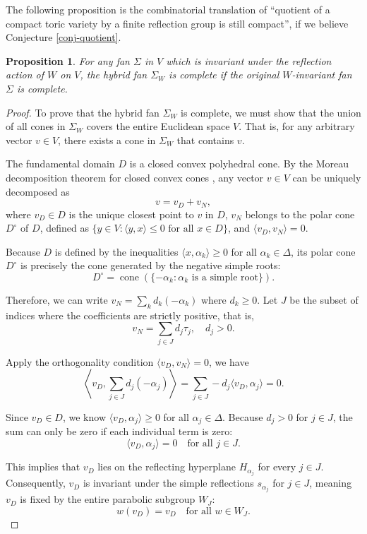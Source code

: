 \documentclass{amsart}
\newtheorem{proposition}[theorem]{Proposition}
\theoremstyle{definition}
\theoremstyle{remark}
\numberwithin{equation}{section}
\begin{document}
The following proposition is the combinatorial translation of ``quotient of a compact toric variety by a finite reflection group is still compact'', if we believe Conjecture \ref{conj-quotient}.
\begin{proposition} \label{prop-completeness}
    For any fan $\Sigma$ in $V$ which is invariant under the reflection action of $W$ on $V$, the hybrid fan $\Sigma_W$ is complete if the original $W$-invariant fan $\Sigma$ is complete.
\end{proposition}
\begin{proof}
To prove that the hybrid fan $\Sigma_W$ is complete, we must show that the union of all cones in $\Sigma_W$ covers the entire Euclidean space $V$. That is, for any arbitrary vector $v \in V$, there exists a cone in $\Sigma_W$ that contains $v$.

The fundamental domain $D$ is a closed convex polyhedral cone. By the Moreau decomposition theorem for closed convex cones \cite[Theorem 3.2.5]{hiriart2013convex}, any vector $v \in V$ can be uniquely decomposed as
$$v = v_D + v_N,$$
where $v_D \in D$ is the unique closest point to $v$ in $D$, $v_N$ belongs to the polar cone $D^\circ$ of $D$, defined as $\{y \in V : \langle y, x \rangle \leq 0 \text{ for all } x \in D\}$, and $\langle v_D, v_N \rangle = 0$.

Because $D$ is defined by the inequalities $\langle x, \alpha_k \rangle \geq 0$ for all $\alpha_k \in \Delta$, its polar cone $D^\circ$ is precisely the cone generated by the negative simple roots:
$$D^\circ = \operatorname{cone}(\{-\alpha_k : \alpha_k \text{ is a simple root}\}).$$

Therefore, we can write $v_N = \sum_{k} d_k (-\alpha_k)$ where $d_k \geq 0$. 
Let $J$ be the subset of indices where the coefficients are strictly positive, that is, 
$$v_N = \sum_{j \in J} d_j \tau_j, \quad d_j > 0.$$

Apply the orthogonality condition $\langle v_D, v_N \rangle = 0$, we have
$$\left\langle v_D, \sum_{j \in J} d_j (-\alpha_j) \right\rangle = \sum_{j \in J} -d_j \langle v_D, \alpha_j \rangle = 0.$$

Since $v_D \in D$, we know $\langle v_D, \alpha_j \rangle \geq 0$ for all $\alpha_j\in \Delta$. Because $d_j > 0$ for $j \in J$, the sum can only be zero if each individual term is zero:
$$\langle v_D, \alpha_j \rangle = 0 \quad \text{for all } j \in J.$$

This implies that $v_D$ lies on the reflecting hyperplane $H_{\alpha_j}$ for every $j \in J$. Consequently, $v_D$ is invariant under the simple reflections $s_{\alpha_j}$ for $j \in J$, meaning $v_D$ is fixed by the entire parabolic subgroup $W_J$:
$$w(v_D) = v_D \quad \text{for all } w \in W_J.$$


\end{proof}
\end{document}
